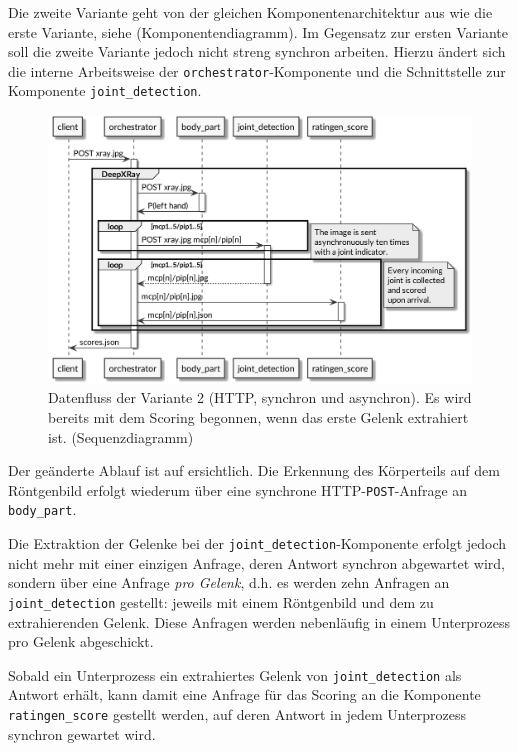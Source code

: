 Die zweite Variante geht von der gleichen Komponentenarchitektur aus wie die erste Variante, siehe  (Komponentendiagramm). Im Gegensatz zur ersten Variante soll die zweite Variante jedoch nicht streng synchron arbeiten. Hierzu ändert sich die interne Arbeitsweise der \texttt{orchestrator}-Komponente und die Schnittstelle zur Komponente \texttt{joint\_detection}.

\begin{figure}[tbh]
    \centering
    \includegraphics[width=\linewidth]{pics/datenfluss-variante-http-2.png}
    \caption{Datenfluss der Variante 2 (HTTP, synchron und asynchron). Es wird bereits mit dem Scoring begonnen, wenn das erste Gelenk extrahiert ist. (Sequenzdiagramm)}
    \label{fig:datenfluss-variante-http-2}
\end{figure}

Der geänderte Ablauf ist auf  ersichtlich. Die Erkennung des Körperteils auf dem Röntgenbild erfolgt wiederum über eine synchrone HTTP-\texttt{POST}-Anfrage an \texttt{body\_part}.

Die Extraktion der Gelenke bei der \texttt{joint\_detection}-Komponente erfolgt jedoch nicht mehr mit einer einzigen Anfrage, deren Antwort synchron abgewartet wird, sondern über eine Anfrage \textit{pro Gelenk}, d.h. es werden zehn Anfragen an \texttt{joint\_detection} gestellt: jeweils mit einem Röntgenbild und dem zu extrahierenden Gelenk. Diese Anfragen werden nebenläufig in einem Unterprozess pro Gelenk abgeschickt.

Sobald ein Unterprozess ein extrahiertes Gelenk von \texttt{joint\_detection} als Antwort erhält, kann damit eine Anfrage für das Scoring an die Komponente \texttt{ratingen\_score} gestellt werden, auf deren Antwort in jedem Unterprozess synchron gewartet wird.

